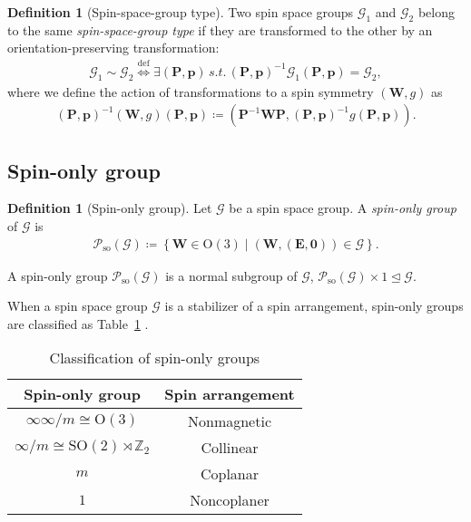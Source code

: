 \documentclass[a4paper, 11pt]{article}
\theoremstyle{definition}
\newcommand{\term}[1]{\textit{#1}}
\newcommand{\relmiddle}[1]{\mathrel{}\middle#1\mathrel{}}
\newcommand{\set}[2]{\left\{ #1 \relmiddle| #2 \right\}}
\newtheorem{definition}[theorem]{Definition}
\begin{document}
\begin{screen}
  \begin{definition}[Spin-space-group type]
    Two spin space groups $\mathcal{G}_{1}$ and $\mathcal{G}_{2}$ belong to the same \term{spin-space-group type} if they are transformed to the other by an orientation-preserving transformation:
    \begin{align}
      \mathcal{G}_{1} \sim \mathcal{G}_{2}
      \overset{\mathrm{def}}{\Longleftrightarrow}
      \exists (\bm{P}, \bm{p}) \,s.t.\, (\bm{P}, \bm{p})^{-1} \mathcal{G}_{1} (\bm{P}, \bm{p}) = \mathcal{G}_{2},
    \end{align}
    where we define the action of transformations to a spin symmetry $(\bm{W}, g)$ as
    \begin{align}
      (\bm{P}, \bm{p})^{-1} (\bm{W}, g) (\bm{P}, \bm{p})
      \coloneqq
      (\bm{P}^{-1}\bm{W}\bm{P}, (\bm{P}, \bm{p})^{-1} g (\bm{P}, \bm{p})).
    \end{align}
  \end{definition}
\end{screen}

\subsection{Spin-only group}

\begin{screen}
  \begin{definition}[Spin-only group]
    Let $\mathcal{G}$ be a spin space group.
    A \term{spin-only group} of $\mathcal{G}$ is
    \begin{align}
      \mathcal{P}_{\mathrm{so}}(\mathcal{G})
      \coloneqq
      \set{ \bm{W} \in \mathrm{O}(3) }{ (\bm{W}, (\bm{E}, \bm{0})) \in \mathcal{G} }.
    \end{align}
  \end{definition}
\end{screen}

A spin-only group $\mathcal{P}_{\mathrm{so}}(\mathcal{G})$ is a normal subgroup of $\mathcal{G}$, $\mathcal{P}_{\mathrm{so}}(\mathcal{G}) \times 1 \trianglelefteq \mathcal{G}$.

When a spin space group $\mathcal{G}$ is a stabilizer of a spin arrangement, spin-only groups are classified as Table~\ref{tab:spin_only_group} \cite{LITVIN1974538,PhysRevX.12.021016}.

\begin{table}[tb]
  \centering
  \caption{Classification of spin-only groups}
  \label{tab:spin_only_group}
  \begin{tabular}{cc}
    \hline \hline
    Spin-only group & Spin arrangement \\
    \hline
    $\infty \infty / m \cong \mathrm{O}(3)$ & Nonmagnetic \\
    $\infty / m \cong \mathrm{SO}(2) \rtimes \mathbb{Z}_{2} $ & Collinear \\
    $m$ & Coplanar \\
    $1$ & Noncoplaner \\
    \hline \hline
  \end{tabular}
\end{table}
\end{document}
